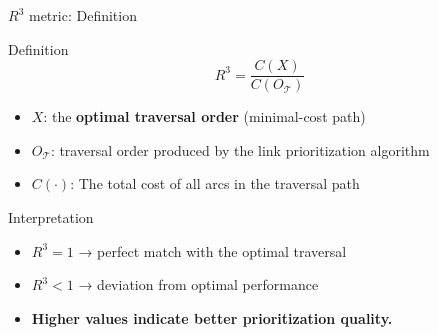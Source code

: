 
\begin{frame}{$R^{3}$ metric: Definition}
  \begin{block}{Definition}
    \[
      R^{3} = \frac{C(X)}{C(O_{\mathcal{T}})}
    \]
  \end{block}

  \begin{itemize}
    \item $X$: the \textbf{optimal traversal order} (minimal-cost path)
    \item $O_{\mathcal{T}}$: traversal order produced by the link prioritization algorithm
    \item $C(\cdot)$: The total cost of all arcs in the traversal path
  \end{itemize}
  \vspace{0.8em}
  \begin{exampleblock}{Interpretation}
    \begin{itemize}
      \item $R^{3} = 1$ → perfect match with the optimal traversal  
      \item $R^{3} < 1$ → deviation from optimal performance  
      \item \textbf{Higher values indicate better prioritization quality.}
    \end{itemize}
  \end{exampleblock}

\end{frame}
